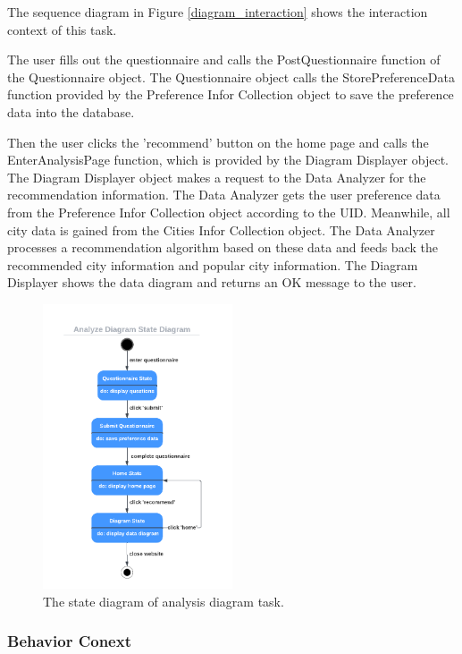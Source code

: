 \documentclass[conference]{IEEEtran}
\begin{document}
\textbf{}

The sequence diagram in Figure \ref{diagram_interaction} shows the interaction context of this task. 

The user fills out the questionnaire and calls the PostQuestionnaire function of the Questionnaire object. The Questionnaire object calls the StorePreferenceData function provided by the Preference Infor Collection object to save the preference data into the database. 

Then the user clicks the 'recommend' button on the home page and calls the EnterAnalysisPage function, which is provided by the Diagram Displayer object. The Diagram Displayer object makes a request to the Data Analyzer for the recommendation information. The Data Analyzer gets the user preference data from the Preference Infor Collection object according to the UID. Meanwhile, all city data is gained from the Cities Infor Collection object. The Data Analyzer processes a recommendation algorithm based on these data and feeds back the recommended city information and popular city information. The Diagram Displayer shows the data diagram and returns an OK message to the user.


\begin{figure}[htbp]
\centerline{\includegraphics[width=0.5\textwidth]{diagram_state_diagram.pdf}}
\caption{The state diagram of analysis diagram task.}
\label{diagram_state_diagram}
\end{figure}


\subsubsection{\textbf{Behavior Conext }}
\end{document}
